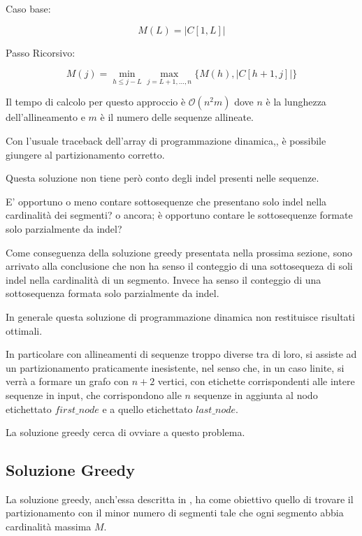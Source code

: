 Caso base:

\begin{equation*}
    M(L)= |C[1,L]| 
\end{equation*}

Passo Ricorsivo:

\begin{equation*}
    M(j)= \min_{h \leq j-L} \max_{j=L+1,...,n} \{M(h),|C[h+1,j]|\}
\end{equation*}

Il tempo di calcolo per questo approccio è $\mathcal{O}(n^2m)$ dove $n$ è la lunghezza dell'allineamento e $m$ è il numero delle sequenze allineate.

Con l'usuale traceback dell'array di programmazione dinamica,, è possibile giungere al partizionamento corretto.

Questa soluzione non tiene però conto degli indel presenti nelle sequenze. 

E' opportuno o meno contare sottosequenze che presentano solo indel nella cardinalità dei segmenti? o ancora; è opportuno contare le sottosequenze formate solo parzialmente da indel?

Come conseguenza della soluzione greedy presentata nella prossima sezione, sono arrivato alla conclusione che non ha senso il conteggio di una sottosequeza di soli indel nella cardinalità di un segmento. Invece ha senso il conteggio di una sottosequenza formata solo parzialmente da indel.

In generale questa soluzione di programmazione dinamica non restituisce risultati ottimali.

In particolare con allineamenti di sequenze troppo diverse tra di loro, si assiste ad un partizionamento praticamente inesistente, nel senso che, in un caso linite, si verrà a formare un grafo con $n+2$ vertici, con etichette corrispondenti alle intere sequenze in input, che corrispondono alle $n$ sequenze in aggiunta al nodo etichettato $first\_node$ e a quello etichettato $last\_node$.

La soluzione greedy cerca di ovviare a questo problema.

\subsection{Soluzione Greedy}

La soluzione greedy, anch'essa descritta in \cite{ukkonen}, ha come obiettivo quello di trovare il partizionamento con il minor numero di segmenti tale che ogni segmento abbia cardinalità massima $M$.

